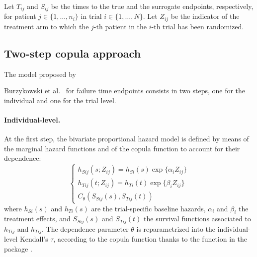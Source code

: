 \documentclass[]{scrartcl}\usepackage[]{graphicx}\usepackage[]{color}
\begin{document}
{Let $T_{ij}$ and $S_{ij}$ be the times to the true and the surrogate 
  endpoints, respectively,
  for patient $j\in\{1, \ldots, n_i\}$
  in trial  $i\in\{1, \ldots, N\}$.
Let $Z_{ij}$ be the indicator of the treatment arm
  to which the $j$-th patient in the $i$-th trial has been randomized.


\subsection{Two-step copula approach}
\label{sec:copulaApp}
The model proposed by {Burzykowski et al.~\cite{BurzykowskiEtal01} for failure time endpoints
  consists in two steps, one for the individual and one for the trial level.

\paragraph{Individual-level.}
At the first step, the bivariate proportional hazard model is defined
  by means of the marginal hazard functions and
  of the copula function to account for their dependence:
  \begin{equation}
    \begin{cases}
      h_{Sij}(s; Z_{ij}) = h_{Si}(s) \exp\big\{
        \alpha_i Z_{ij} 
      \big\}\\
      h_{Tij}(t; Z_{ij}) = h_{Ti}(t) \exp\big\{
        \beta_i Z_{ij}
      \big\}\\
      C_\theta(S_{Sij}(s), S_{Tij}(t))
    \end{cases}
    \label{eq:copulaModel}
  \end{equation}
  where $h_{Si}(s)$ and $h_{Ti}(s)$ are the trial-specific baseline hazards,
  $\alpha_i$ and $\beta_i$ the treatment effects,
  and $S_{Sij}(s)$ and $S_{Tij}(t)$ the survival functions associated to
  $h_{Tij}$ and $h_{Tij}$.
The dependence parameter $\theta$
  is reparametrized into the individual-level Kendall's $\tau$,
  according to the copula function
  thanks to the  function in the 
   package \citep{R:copula, Yan07}.

}}
\end{document}

